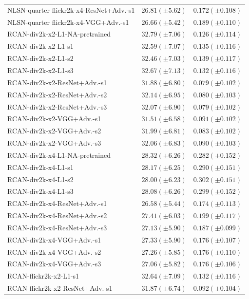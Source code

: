 \documentclass[10pt]{article} %
\begin{document}
\begin{longtable}{| p{} | p{} | p{} |}
NLSN-quarter flickr2k-x4-ResNet+Adv.-s1 & $26.81 (\pm 5.62)$ & $0.172 (\pm 0.108)$ \\
NLSN-quarter flickr2k-x4-VGG+Adv.-s1 & $26.66 (\pm 5.42)$ & $0.189 (\pm 0.110)$ \\
RCAN-div2k-x2-L1-NA-pretrained & $32.79 (\pm 7.06)$ & $0.126 (\pm 0.114)$ \\
RCAN-div2k-x2-L1-s1 & $32.59 (\pm 7.07)$ & $0.135 (\pm 0.116)$ \\
RCAN-div2k-x2-L1-s2 & $32.46 (\pm 7.03)$ & $0.139 (\pm 0.117)$ \\
RCAN-div2k-x2-L1-s3 & $32.67 (\pm 7.13)$ & $0.132 (\pm 0.116)$ \\
RCAN-div2k-x2-ResNet+Adv.-s1 & $31.88 (\pm 6.80)$ & $0.079 (\pm 0.102)$ \\
RCAN-div2k-x2-ResNet+Adv.-s2 & $32.14 (\pm 6.95)$ & $0.080 (\pm 0.103)$ \\
RCAN-div2k-x2-ResNet+Adv.-s3 & $32.07 (\pm 6.90)$ & $0.079 (\pm 0.102)$ \\
RCAN-div2k-x2-VGG+Adv.-s1 & $31.51 (\pm 6.58)$ & $0.091 (\pm 0.102)$ \\
RCAN-div2k-x2-VGG+Adv.-s2 & $31.99 (\pm 6.81)$ & $0.083 (\pm 0.102)$ \\
RCAN-div2k-x2-VGG+Adv.-s3 & $32.06 (\pm 6.83)$ & $0.090 (\pm 0.103)$ \\
RCAN-div2k-x4-L1-NA-pretrained & $28.32 (\pm 6.26)$ & $0.282 (\pm 0.152)$ \\
RCAN-div2k-x4-L1-s1 & $28.17 (\pm 6.25)$ & $0.290 (\pm 0.151)$ \\
RCAN-div2k-x4-L1-s2 & $28.00 (\pm 6.23)$ & $0.302 (\pm 0.151)$ \\
RCAN-div2k-x4-L1-s3 & $28.08 (\pm 6.26)$ & $0.299 (\pm 0.152)$ \\
RCAN-div2k-x4-ResNet+Adv.-s1 & $26.58 (\pm 5.44)$ & $0.174 (\pm 0.113)$ \\
RCAN-div2k-x4-ResNet+Adv.-s2 & $27.41 (\pm 6.03)$ & $0.199 (\pm 0.117)$ \\
RCAN-div2k-x4-ResNet+Adv.-s3 & $27.13 (\pm 5.90)$ & $0.187 (\pm 0.099)$ \\
RCAN-div2k-x4-VGG+Adv.-s1 & $27.33 (\pm 5.90)$ & $0.176 (\pm 0.107)$ \\
RCAN-div2k-x4-VGG+Adv.-s2 & $27.26 (\pm 5.85)$ & $0.176 (\pm 0.110)$ \\
RCAN-div2k-x4-VGG+Adv.-s3 & $27.06 (\pm 5.82)$ & $0.176 (\pm 0.106)$ \\
RCAN-flickr2k-x2-L1-s1 & $32.64 (\pm 7.09)$ & $0.132 (\pm 0.116)$ \\
RCAN-flickr2k-x2-ResNet+Adv.-s1 & $31.87 (\pm 6.74)$ & $0.092 (\pm 0.104)$ \\

\end{longtable}
\end{document}
